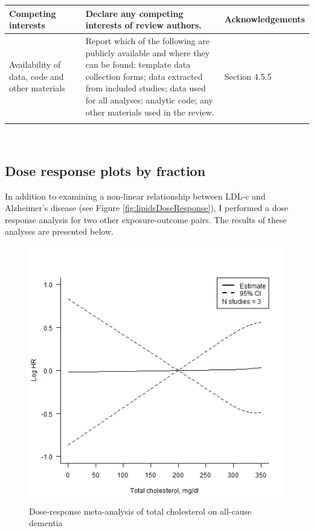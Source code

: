 \documentclass[a4paper, twoside]{templates/ociamthesis}
\begin{document}
\begin{longtable}[t]{>{\raggedright\arraybackslash}p{8.45em}>{\centering\arraybackslash}p{2.1em}>{\raggedright\arraybackslash}p{13.5em}>{\raggedright\arraybackslash}p{7.45em}}
\midrule
\addlinespace
Competing interests & 26 & Declare any competing interests of review authors. & Acknowledgements\\
\midrule
\addlinespace
Availability of data, code and other materials & 27 & Report which of the following are publicly available and where they can be found: template data collection forms; data extracted from included studies; data used for all analyses; analytic code; any other materials used in the review. & Section 4.5.5\\*
\end{longtable}


~

\hypertarget{appendix-dr-fraction}{%
\subsection{Dose response plots by fraction}\label{appendix-dr-fraction}}

In addition to examining a non-linear relationship between LDL-c and Alzheimer's disease (see Figure \ref{fig:lipidsDoseResponse}), I performed a dose response analysis for two other exposure-outcome pairs. The results of these analyses are presented below.





\begin{figure}[H]

{\centering \includegraphics[width=0.6\linewidth]{figures/sys-rev/dr_Dementia_TC} 

}

\caption[Dose-response meta-analysis of total cholesterol on all-cause dementia]{Dose-response meta-analysis of total cholesterol on all-cause dementia}\label{fig:drDemeniaTC}
\end{figure}
\end{document}
